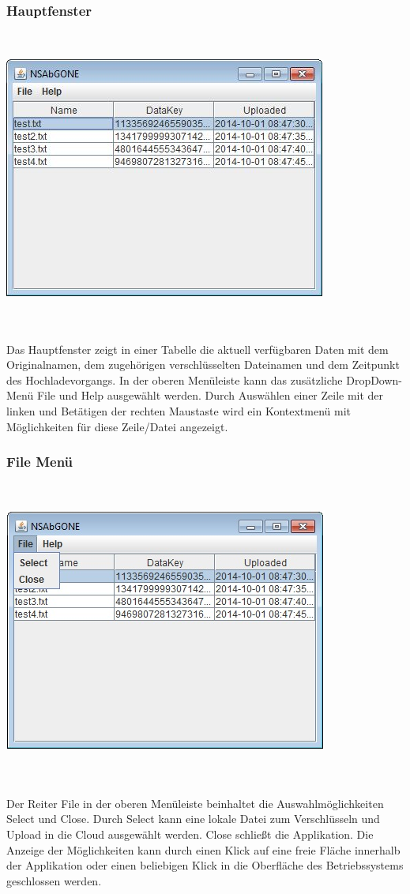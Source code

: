 \documentclass[13pt,a4paper,bibliography=totocnumbered,listof=totocnumbered]{scrartcl}
\begin{document}
\subsubsection{Hauptfenster}
$\;$\\
\begin{minipage}{\linewidth}
	\centering
	\includegraphics[width=0.4\linewidth]{./img/Main.jpg}
	\label{Main}
\end{minipage}
\\\\Das Hauptfenster zeigt in einer Tabelle die aktuell verfügbaren Daten mit dem Originalnamen, dem zugehörigen verschlüsselten Dateinamen und dem Zeitpunkt des Hochladevorgangs. In der oberen Menüleiste kann das zusätzliche DropDown-Menü File und Help ausgewählt werden. Durch Auswählen einer Zeile mit der linken und Betätigen der rechten Maustaste wird ein Kontextmenü mit Möglichkeiten für diese Zeile/Datei angezeigt.

\subsubsection{File Menü}
$\;$\\
\begin{minipage}{\linewidth}
	\centering
	\includegraphics[width=0.4\linewidth]{./img/File.jpg}
	\label{File}
\end{minipage}
\\\\Der Reiter File in der oberen Menüleiste beinhaltet die Auswahlmöglichkeiten Select und Close. Durch Select kann eine lokale Datei zum Verschlüsseln und Upload in die Cloud ausgewählt werden. Close schließt die Applikation. Die Anzeige der Möglichkeiten kann durch einen Klick auf eine freie Fläche innerhalb der Applikation oder einen beliebigen Klick in die Oberfläche des Betriebssystems geschlossen werden.
\end{document}
